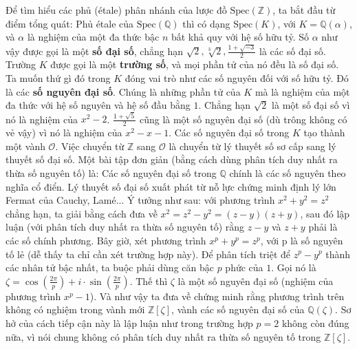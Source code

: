 \begin{multicols}{2}
	Để tìm hiểu các phủ (étale) phân nhánh của lược đồ $\text{Spec}(\mathbb{Z})$, ta bắt đầu từ điểm tổng quát: Phủ étale của $\text{Spec}(\mathbb{Q})$ thì có dạng $\text{Spec}(K)$, với $K = \mathbb{Q}(\alpha)$, và $\alpha$ là nghiệm của một đa thức bậc $n$ bất khả quy với hệ số hữu tỷ. Số $\alpha$ như vậy được gọi là một {\bf\color{duongvaotoanhoc} số đại số}, chẳng hạn $\sqrt{2}, \sqrt[3]{2}, \frac{1 + \sqrt{-3}}{2}$ là các số đại số. Trường $K$ được gọi là một {\bf\color{duongvaotoanhoc} trường số}, và mọi phần tử của nó đều là số đại số. Ta muốn thứ gì đó trong $K$ đóng vai trò như các số nguyên đối với số hữu tỷ. Đó là các {\bf\color{duongvaotoanhoc} số nguyên đại số}. Chúng là những phần tử của $K$ mà là nghiệm của một đa thức với hệ số nguyên và hệ số đầu bằng $1$. Chẳng hạn $\sqrt{2}$ là một số đại số vì nó là nghiệm của $x^2 - 2$. $\frac{1 + \sqrt{5}}{2}$ cũng là một số nguyên đại số (dù trông không có vẻ vậy) vì nó là nghiệm của $x^2-x-1$. Các số nguyên đại số trong $K$ tạo thành một vành $\mathcal{O}$. Việc chuyển từ $\mathbb{Z}$ sang $\mathcal{O}$ là chuyển từ lý thuyết số sơ cấp sang lý thuyết số đại số. Một bài tập đơn giản (bằng cách dùng phân tích duy nhất ra thừa số nguyên tố) là: Các số nguyên đại số trong $\mathbb{Q}$ chính là các số nguyên theo nghĩa cổ điển.
	\vskip 0.1cm
	Lý thuyết số đại số xuất phát từ nỗ lực chứng minh định lý lớn Fermat của Cauchy, Lamé... Ý tưởng như sau: với phương trình $x^2 + y^2 = z^2$ chẳng hạn, ta giải bằng cách đưa về $x^2=z^2-y^2=(z-y)(z+y)$, sau đó lập luận (với phân tích duy nhất ra thừa số nguyên tố) rằng $z-y$ và $z+y$ phải là các số chính phương. Bây giờ, xét phương trình $x^p+y^p=z^p$, với p là số nguyên tố lẻ (dễ thấy ta chỉ cần xét trường hợp này). Để phân tích triệt để $z^p-y^p$ thành các nhân tử bậc nhất, ta buộc phải dùng căn bậc $p$ phức của $1$. Gọi nó là $\zeta = \cos(\frac{2\pi}{p})+i \cdot \sin(\frac{2\pi}{p})$. Thế thì $\zeta$ là một số nguyên đại số (nghiệm của phương trình $x^p - 1$). Và như vậy ta đưa về chứng minh rằng phương trình trên không có nghiệm trong vành mới $\mathbb{Z}[\zeta]$, vành các số nguyên đại số của $\mathbb{Q}(\zeta)$. Sơ hở của cách tiếp cận này là lập luận như trong trường hợp $p=2$ không còn đúng nữa, vì nói chung không có phân tích duy nhất ra thừa số nguyên tố trong $\mathbb{Z}[\zeta]$.
	\vskip 0.1cm

\end{multicols}
